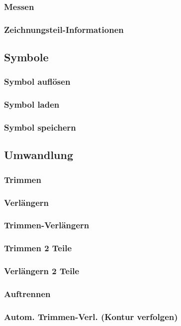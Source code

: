 \documentclass[14pt,a4paper]{book}
\begin{document}
			\subsubsection{Messen} 
			\subsubsection{Zeichnungsteil-Informationen} 
		\subsection{Symbole}
			\subsubsection{Symbol auflösen}
			\subsubsection{Symbol laden} 
			\subsubsection{Symbol speichern} 
		\subsection{Umwandlung}		
			\subsubsection{Trimmen} 
			\subsubsection{Verlängern} 
			\subsubsection{Trimmen-Verlängern} 
			\subsubsection{Trimmen 2 Teile} 
			\subsubsection{Verlängern 2 Teile} 
			\subsubsection{Auftrennen} 
			\subsubsection{Autom. Trimmen-Verl. (Kontur verfolgen)} 
\end{document}
